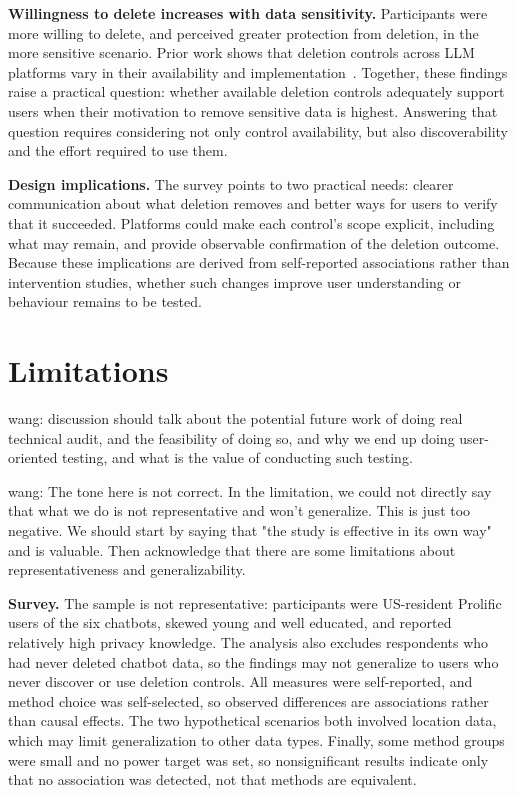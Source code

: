 \documentclass[conference,compsoc]{IEEEtran}
\newcommand{\xw}[1] {{\color{red}wang: #1}}
\begin{document}
\textbf{Willingness to delete increases with data sensitivity.} Participants were more willing to delete, and perceived greater protection from deletion, in the more sensitive scenario. Prior work shows that deletion controls across LLM platforms vary in their availability and implementation~\cite{li2026privacy}. Together, these findings raise a practical question: whether available deletion controls adequately support users when their motivation to remove sensitive data is highest. Answering that question requires considering not only control availability, but also discoverability and the effort required to use them.

\textbf{Design implications.} The survey points to two practical needs: clearer communication about what deletion removes and better ways for users to verify that it succeeded. Platforms could make each control's scope explicit, including what may remain, and provide observable confirmation of the deletion outcome. Because these implications are derived from self-reported associations rather than intervention studies, whether such changes improve user understanding or behaviour remains to be tested.

\section{Limitations}

\xw{discussion should talk about the potential future work of doing real technical audit, and the feasibility of doing so, and why we end up doing user-oriented testing, and what is the value of conducting such testing.}

\xw{The tone here is not correct. In the limitation, we could not directly say that what we do is not representative and won't generalize. This is just too negative. We should start by saying that "the study is effective in its own way" and is valuable. Then acknowledge that there are some limitations about representativeness and generalizability.}

\textbf{Survey.} The sample is not representative: participants were US-resident Prolific users of the six chatbots, skewed young and well educated, and reported relatively high privacy knowledge. The analysis also excludes respondents who had never deleted chatbot data, so the findings may not generalize to users who never discover or use deletion controls. All measures were self-reported, and method choice was self-selected, so observed differences are associations rather than causal effects. The two hypothetical scenarios both involved location data, which may limit generalization to other data types. Finally, some method groups were small and no power target was set, so nonsignificant results indicate only that no association was detected, not that methods are equivalent.
\end{document}
